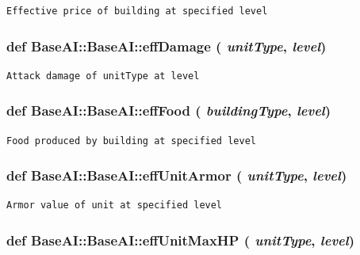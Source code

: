 \footnotesize\begin{verbatim}Effective price of building at specified level
\end{verbatim}
\normalsize
 \hypertarget{classBaseAI_1_1BaseAI_a65ecba249b1a0b5e57e1239743a78a1}{
\subsubsection[{effDamage}]{\setlength{\rightskip}{0pt plus 5cm}def BaseAI::BaseAI::effDamage ( {\em unitType}, \/   {\em level})}}
\label{classBaseAI_1_1BaseAI_a65ecba249b1a0b5e57e1239743a78a1}




\footnotesize\begin{verbatim}Attack damage of unitType at level
\end{verbatim}
\normalsize
 \hypertarget{classBaseAI_1_1BaseAI_3be07e2721397adc75bb376159e0bae2}{
\subsubsection[{effFood}]{\setlength{\rightskip}{0pt plus 5cm}def BaseAI::BaseAI::effFood ( {\em buildingType}, \/   {\em level})}}
\label{classBaseAI_1_1BaseAI_3be07e2721397adc75bb376159e0bae2}




\footnotesize\begin{verbatim}Food produced by building at specified level
\end{verbatim}
\normalsize
 \hypertarget{classBaseAI_1_1BaseAI_1dd31cd1b03afcc70ce557189d9ee1b5}{
\subsubsection[{effUnitArmor}]{\setlength{\rightskip}{0pt plus 5cm}def BaseAI::BaseAI::effUnitArmor ( {\em unitType}, \/   {\em level})}}
\label{classBaseAI_1_1BaseAI_1dd31cd1b03afcc70ce557189d9ee1b5}




\footnotesize\begin{verbatim}Armor value of unit at specified level
\end{verbatim}
\normalsize
 \hypertarget{classBaseAI_1_1BaseAI_3ee6663a189eabaa5755c2f2f205c7fd}{
\subsubsection[{effUnitMaxHP}]{\setlength{\rightskip}{0pt plus 5cm}def BaseAI::BaseAI::effUnitMaxHP ( {\em unitType}, \/   {\em level})}}
\label{classBaseAI_1_1BaseAI_3ee6663a189eabaa5755c2f2f205c7fd}





